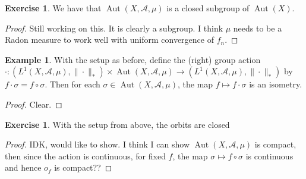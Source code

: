 \documentclass[12pt]{amsart}
\theoremstyle{definition}
\newtheorem{ex}[definition]{Exercise}
\newtheorem{exm}[definition]{Example}
\newcommand{\sig}{\sigma}
\newcommand{\MA}{\mathcal{A}}
\DeclareMathOperator{\Aut}{Aut}
\begin{document}
	\begin{ex}
	We have that $\Aut(X, \MA, \mu)$ is a closed subgroup of $\Aut(X)$.
	\end{ex}
	
	\begin{proof}
	Still working on this. It is clearly a subgroup. I think $\mu$ needs to be a Radon measure to work well with uniform convergence of $f_n$.
	\end{proof}
	
	\begin{exm}
	With the setup as before, define the (right) group action \\ $\cdot: (L^1(X, \MA, \mu), \|\cdot\|_*) \times \Aut(X, \MA, \mu) \rightarrow (L^1(X, \MA, \mu), \|\cdot\|_*) $ by $f \cdot \sig = f \circ \sig$. Then for each $\sig \in \Aut(X, \MA, \mu)$, the map $f \mapsto f \cdot \sig$ is an isometry. 
	\end{exm}
	
	\begin{proof}
	Clear.
	\end{proof}
	
	\begin{ex}
	With the setup from above, the orbits are closed
	\end{ex}
	
	\begin{proof}
	IDK, would like to show. I think I can show $\Aut(X, \MA, \mu)$ is compact, then since the action is continuous, for fixed $f$, the map $\sig \mapsto f \circ \sig$ is continuous and hence $o_f$ is compact??
	\end{proof}
	
	
\end{document}
